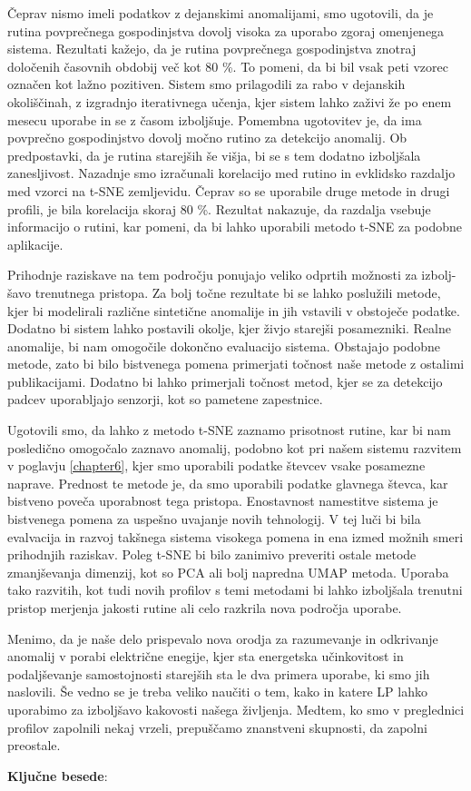 \begin{sloabstract}
Čeprav nismo imeli podatkov z dejanskimi anomalijami, smo ugotovili, da je rutina povprečnega gospodinjstva dovolj visoka za uporabo zgoraj omenjenega sistema. Rezultati kažejo, da je rutina povprečnega gospodinjstva znotraj določenih časovnih obdobij več kot 80 \%. To pomeni, da bi bil vsak peti vzorec označen kot lažno pozitiven. Sistem smo prilagodili za rabo v dejanskih okoliščinah, z izgradnjo iterativnega učenja, kjer sistem lahko zaživi že po enem mesecu uporabe in se z časom izboljšuje. Pomembna ugotovitev je, da ima povprečno gospodinjstvo dovolj močno rutino za detekcijo anomalij. Ob predpostavki, da je rutina starejših še višja, bi se s tem dodatno izboljšala zanesljivost. Nazadnje smo izračunali korelacijo med rutino in evklidsko razdaljo med vzorci na t-SNE zemljevidu. Čeprav so se uporabile druge metode in drugi profili, je bila korelacija skoraj 80 \%. Rezultat nakazuje, da razdalja vsebuje informacijo o rutini, kar pomeni, da bi lahko uporabili metodo t-SNE za podobne aplikacije.  

Prihodnje raziskave na tem področju ponujajo veliko odprtih možnosti za izbolj-šavo trenutnega pristopa. Za bolj točne rezultate bi se lahko poslužili metode, kjer bi modelirali različne sintetične anomalije in jih vstavili v obstoječe podatke. Dodatno bi sistem lahko postavili okolje, kjer živjo starejši posamezniki. Realne anomalije, bi nam omogočile dokončno evaluacijo sistema. Obstajajo podobne metode, zato bi bilo bistvenega pomena primerjati točnost naše metode z ostalimi publikacijami. Dodatno bi lahko primerjali točnost metod, kjer se za detekcijo padcev uporabljajo senzorji, kot so pametene zapestnice.  

Ugotovili smo, da lahko z metodo t-SNE zaznamo prisotnost rutine, kar bi nam posledično omogočalo zaznavo anomalij, podobno kot pri našem sistemu razvitem v poglavju \ref{chapter6}, kjer smo uporabili podatke števcev vsake posamezne naprave. Prednost te metode je, da smo uporabili podatke glavnega števca, kar bistveno poveča uporabnost tega pristopa. Enostavnost namestitve sistema je bistvenega pomena za uspešno uvajanje novih tehnologij. V tej luči bi bila evalvacija in razvoj takšnega sistema visokega pomena in ena izmed možnih smeri prihodnjih raziskav. Poleg t-SNE bi bilo zanimivo preveriti ostale metode zmanjševanja dimenzij, kot so PCA ali bolj napredna UMAP metoda. Uporaba tako razvitih, kot tudi novih profilov s temi metodami bi lahko izboljšala trenutni pristop merjenja jakosti rutine ali celo razkrila nova področja uporabe.  

Menimo, da je naše delo prispevalo nova orodja za razumevanje in odkrivanje anomalij v porabi električne enegije, kjer sta energetska učinkovitost in podaljševanje samostojnosti starejših sta le dva primera uporabe, ki smo jih naslovili. Še vedno se je treba veliko naučiti o tem, kako in katere LP lahko uporabimo za izboljšavo kakovosti našega življenja. Medtem, ko smo v preglednici profilov zapolnili nekaj vrzeli, prepuščamo znanstveni skupnosti, da zapolni preostale.  


\par\textbf{Ključne besede}: \slokeywordnames 
  
  \end{sloabstract}